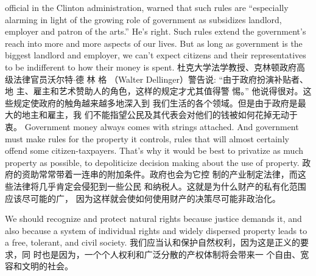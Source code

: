 \begin{paracol}{2}
official in the Clinton administration, warned that such rules
are ``especially alarming in light of the growing role of government as subsidizes landlord, employer and patron of the arts.''
He's right. Such rules extend the government's reach into more
and more aspects of our lives. But as long as government is the
biggest landlord and employer, we can't expect citizens and
their representatives to be indifferent to how their money is
spent.
\switchcolumn
杜克大学法学教授、克林顿政府高级法律官员沃尔特$\cdot$德
林 格 （Walter Dellinger）警告说: “由于政府扮演补贴者、地
主、雇主和艺术赞助人的角色，这样的规定才尤其值得警
惕。” 他说得很对。这些规定使政府的触角越来越多地深入到
我们生活的各个领域。但是由于政府是最大的地主和雇主，我
们不能指望公民及其代表会对他们的钱被如何花掉无动于衷。
\switchcolumn*
Government money always comes with strings attached.
And government must make rules for the property it controls, rules that will almost certainly offend some citizen-taxpayers.
That's why it would be best to privatize as much property as
possible, to depoliticize decision making about the use of
property.
\switchcolumn
政府的资助常常带着一连串的附加条件。政府也会为它控
制的产业制定法律，而这些法律将几乎肯定会侵犯到一些公民
和纳税人。这就是为什么财产的私有化范围应该尽可能的广，
因为这样就会使如何使用财产的决策尽可能非政治化。

\switchcolumn*
We should recognize and protect natural rights because justice demands it, and also because a system of individual rights
and widely dispersed property leads to a free, tolerant, and civil
society.
\switchcolumn
我们应当认和保护自然权利，因为这是正义的要求，同
时也是因为，一个个人权利和广泛分散的产权体制将会带来一
个自由、宽容和文明的社会。

\end{paracol}